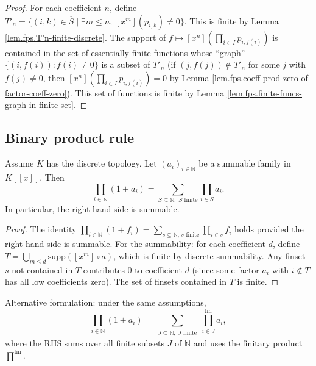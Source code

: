 \begin{proof}
\leanok
For each coefficient $n$, define
$T'_n = \{(i,k)\in\overline{S} \mid \exists m\le n,\, [x^m](p_{i,k})\ne 0\}$.
This is finite by Lemma \ref{lem.fps.T'n-finite-discrete}.
The support of $f\mapsto [x^n](\prod_{i\in I} p_{i,f(i)})$ is contained in
the set of essentially finite functions whose ``graph''
$\{(i,f(i)) : f(i)\ne 0\}$ is a subset of $T'_n$
(if $(j,f(j))\notin T'_n$ for some $j$ with $f(j)\ne 0$, then
$[x^n](\prod_{i\in I} p_{i,f(i)}) = 0$ by Lemma
\ref{lem.fps.coeff-prod-zero-of-factor-coeff-zero}).
This set of functions is finite by Lemma
\ref{lem.fps.finite-funcs-graph-in-finite-set}.
\end{proof}

\subsection{Binary product rule}

\begin{proposition}
\label{prop.fps.binary-product-rule}
\leanhelper
\leanok
Assume $K$ has the discrete topology. Let $\left(a_i\right)_{i\in\mathbb{N}}$
be a summable family in $K[[x]]$. Then
\[
\prod_{i\in\mathbb{N}}\left(1+a_i\right) =
\sum_{S\subseteq\mathbb{N},\;S\text{ finite}} \prod_{i\in S} a_i.
\]
In particular, the right-hand side is summable.
\end{proposition}

\begin{proof}
\leanok
The identity $\prod_{i\in\mathbb{N}}(1+f_i) = \sum_{s\subseteq\mathbb{N},\,s\text{ finite}} \prod_{i\in s} f_i$ holds
provided the right-hand side is summable.
For the summability: for each coefficient $d$, define
$T = \bigcup_{m\le d}\mathrm{supp}([x^m]\circ a)$, which is finite by
discrete summability. Any finset $s$ not contained in $T$ contributes
$0$ to coefficient $d$ (since some factor $a_i$ with $i\notin T$ has
all low coefficients zero). The set of finsets contained in $T$ is finite.
\end{proof}

\begin{proposition}
\label{prop.fps.binary-product-rule-alt}
\leanhelper
\leanok
Alternative formulation: under the same assumptions,
\[
\prod_{i\in\mathbb{N}}\left(1+a_i\right) =
\sum_{\substack{J\subseteq\mathbb{N},\; J\text{ finite}}}
\prod_{i\in J}^{\mathrm{fin}} a_i,
\]
where the RHS sums over all finite subsets $J$ of $\mathbb{N}$
and uses the finitary product $\prod^{\mathrm{fin}}$.
\end{proposition}

